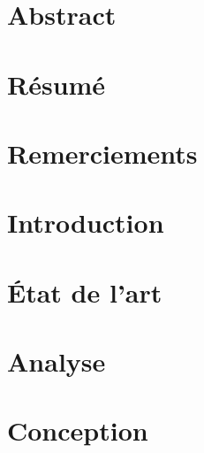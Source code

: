 \documentclass[11pt]{report}
\begin{document}
	
	
	\newpage
	
	\newpage

	
	\renewcommand\labelitemi{\textbullet}
	\renewcommand\labelitemii{\textbullet}
	\renewcommand\labelitemiii{\textbullet}

	\chapter*{Abstract}
			
	
	\chapter*{Résumé}
				
		
	\chapter*{Remerciements}
		
	
	\tableofcontents
	
	\chapter{Introduction}
		
		
	\chapter{État de l'art}
		
			
	\chapter{Analyse}
				
		
	\chapter{Conception}
		
		
\end{document}
